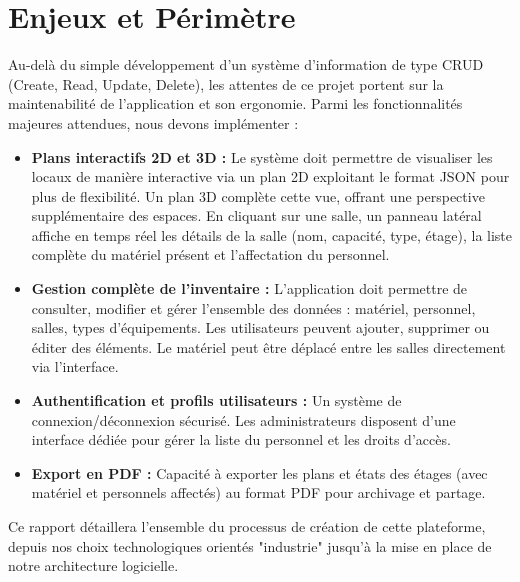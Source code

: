 \section{Enjeux et Périmètre}
Au-delà du simple développement d'un système d'information de type CRUD (Create, Read, Update, Delete), les attentes de ce projet portent sur la maintenabilité de l'application et son ergonomie. Parmi les fonctionnalités majeures attendues, nous devons implémenter :
\begin{itemize}
\item \textbf{Plans interactifs 2D et 3D :} Le système doit permettre de visualiser les locaux de manière interactive via un plan 2D exploitant le format JSON pour plus de flexibilité. Un plan 3D complète cette vue, offrant une perspective supplémentaire des espaces. En cliquant sur une salle, un panneau latéral affiche en temps réel les détails de la salle (nom, capacité, type, étage), la liste complète du matériel présent et l'affectation du personnel.

\item \textbf{Gestion complète de l'inventaire :} L'application doit permettre de consulter, modifier et gérer l'ensemble des données : matériel, personnel, salles, types d'équipements. Les utilisateurs peuvent ajouter, supprimer ou éditer des éléments. Le matériel peut être déplacé entre les salles directement via l'interface.

\item \textbf{Authentification et profils utilisateurs :} Un système de connexion/déconnexion sécurisé. Les administrateurs disposent d'une interface dédiée pour gérer la liste du personnel et les droits d'accès.

\item \textbf{Export en PDF :} Capacité à exporter les plans et états des étages (avec matériel et personnels affectés) au format PDF pour archivage et partage.
\end{itemize}

Ce rapport détaillera l'ensemble du processus de création de cette plateforme, depuis nos choix technologiques orientés "industrie" jusqu'à la mise en place de notre architecture logicielle.